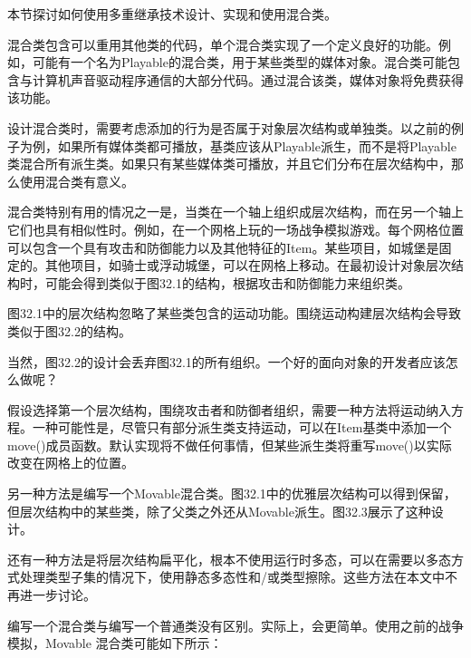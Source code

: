 
本节探讨如何使用多重继承技术设计、实现和使用混合类。


混合类包含可以重用其他类的代码，单个混合类实现了一个定义良好的功能。例如，可能有一个名为Playable的混合类，用于某些类型的媒体对象。混合类可能包含与计算机声音驱动程序通信的大部分代码。通过混合该类，媒体对象将免费获得该功能。

设计混合类时，需要考虑添加的行为是否属于对象层次结构或单独类。以之前的例子为例，如果所有媒体类都可播放，基类应该从Playable派生，而不是将Playable类混合所有派生类。如果只有某些媒体类可播放，并且它们分布在层次结构中，那么使用混合类有意义。

混合类特别有用的情况之一是，当类在一个轴上组织成层次结构，而在另一个轴上它们也具有相似性时。例如，在一个网格上玩的一场战争模拟游戏。每个网格位置可以包含一个具有攻击和防御能力以及其他特征的Item。某些项目，如城堡是固定的。其他项目，如骑士或浮动城堡，可以在网格上移动。在最初设计对象层次结构时，可能会得到类似于图32.1的结构，根据攻击和防御能力来组织类。


图32.1中的层次结构忽略了某些类包含的运动功能。围绕运动构建层次结构会导致类似于图32.2的结构。


当然，图32.2的设计会丢弃图32.1的所有组织。一个好的面向对象的开发者应该怎么做呢？

假设选择第一个层次结构，围绕攻击者和防御者组织，需要一种方法将运动纳入方程。一种可能性是，尽管只有部分派生类支持运动，可以在Item基类中添加一个move()成员函数。默认实现将不做任何事情，但某些派生类将重写move()以实际改变在网格上的位置。

另一种方法是编写一个Movable混合类。图32.1中的优雅层次结构可以得到保留，但层次结构中的某些类，除了父类之外还从Movable派生。图32.3展示了这种设计。


还有一种方法是将层次结构扁平化，根本不使用运行时多态，可以在需要以多态方式处理类型子集的情况下，使用静态多态性和/或类型擦除。这些方法在本文中不再进一步讨论。


编写一个混合类与编写一个普通类没有区别。实际上，会更简单。使用之前的战争模拟，Movable 混合类可能如下所示：

